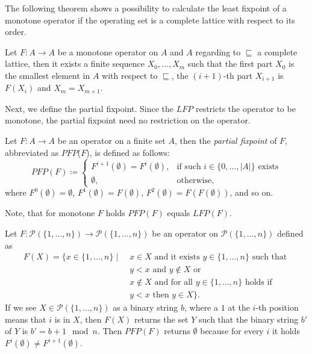 The following theorem shows a possibility to calculate the least fixpoint of a monotone operator if the operating set is a complete lattice with respect to its order.

\begin{theorem}
\label{theorem:kleene}
Let $F: A \rightarrow A$ be a monotone operator on $A$ and $A$ regarding to $\sqsubseteq$ a complete lattice, then it exists a finite sequence $X_0, \dots, X_m$ such that the first part $X_0$ is the smallest element in $A$ with respect to $\sqsubseteq$, the $(i+1)$-th part $X_{i+1}$ is $F(X_i)$ and $X_m = X_{m+1}$.
\end{theorem}

Next, we define the partial fixpoint. Since the
$\mathit{LFP}$ restricts the operator to be monotone, the partial fixpoint need no restriction on the operator.

\begin{definition}
\label{definition:pfp}
    Let $F\colon A \rightarrow A$ be an operator on a finite set $A$, then the \emph{partial
    fixpoint} of $F$, abbreviated as $\mathit{PFP}$($F$), is defined as follows:
    \[\mathit{PFP}(F)\coloneqq\begin{cases}
               F^{i+1}(\emptyset)=F^i(\emptyset),  & \text{if such } i \in \{0,\dots,|A|\} \text{ exists}\\
               \emptyset, & \text{otherwise,}
    \end{cases}\]
    where $F^0(\emptyset) = \emptyset$, $F^1(\emptyset) = F(\emptyset)$, $F^2(\emptyset) = F(F(\emptyset))$, and so on.
\end{definition}

Note, that for monotone $F$ holds $\mathit{PFP}(F)$ equals $\mathit{LFP}(F)$. 


\begin{example}
\label{example:pfp}
Let $F: \mathcal{P}(\{1, \dots, n\}) \rightarrow  \mathcal{P}(\{1, \dots, n\})$ be an operator on $ \mathcal{P}(\{1, \dots, n\})$ defined as
\begin{align*}
	F(X) = \{x \in \{1, \dots, n\}\mid &\; x\in X \text{ and it exists } y \in \{1, \dots, n\} \text{ such that }\\ &\;y < x \text{ and } y\not\in X \text{ or } \\&\;x\not\in X \text{ and for all } y\in \{1,\dots, n\} \text{ holds if } \\&\;y<x \text{ then } y\in X\}. 
\end{align*}
If we see $X \in \mathcal{P}(\{1,\dots, n\})$ as a binary string $b$, where a $1$ at the $i$-th position means that $i$ is in $X$, then $F(X)$ returns the set $Y$ such that the binary string $b'$ of $Y$ is $b' = b+1\mod n$. Then $PFP(F)$ returns $\emptyset$ because for every $i$ it holds $F^i(\emptyset) \neq F^{i+1}(\emptyset)$.
\end{example}